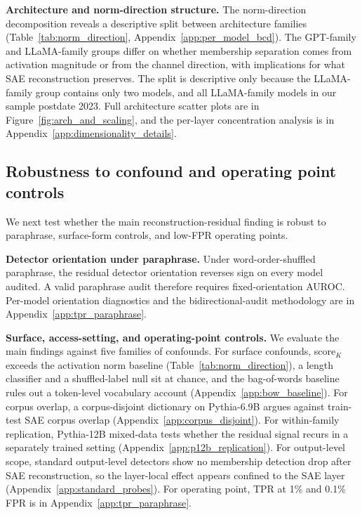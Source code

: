 \textbf{Architecture and norm-direction structure.}
The norm-direction decomposition reveals a descriptive split between architecture families (Table~\ref{tab:norm_direction}, Appendix~\ref{app:per_model_bcd}). The GPT-family and LLaMA-family groups differ on whether membership separation comes from activation magnitude or from the channel direction, with implications for what SAE reconstruction preserves. The split is descriptive only because the LLaMA-family group contains only two models, and all LLaMA-family models in our sample postdate 2023. Full architecture scatter plots are in Figure~\ref{fig:arch_and_scaling}, and the per-layer concentration analysis is in Appendix~\ref{app:dimensionality_details}.

\subsection{Robustness to confound and operating point controls}
\label{sec:results:robustness}

We next test whether the main reconstruction-residual finding is robust to paraphrase, surface-form controls, and low-FPR operating points.

\textbf{Detector orientation under paraphrase.}
Under word-order-shuffled paraphrase, the residual detector orientation reverses sign on every model audited. A valid paraphrase audit therefore requires fixed-orientation AUROC. Per-model orientation diagnostics and the bidirectional-audit methodology are in Appendix~\ref{app:tpr_paraphrase}.

\textbf{Surface, access-setting, and operating-point controls.}
We evaluate the main findings against five families of confounds. For surface confounds, score$_K$ exceeds the activation norm baseline (Table~\ref{tab:norm_direction}), a length classifier and a shuffled-label null sit at chance, and the bag-of-words baseline rules out a token-level vocabulary account (Appendix~\ref{app:bow_baseline}). For corpus overlap, a corpus-disjoint dictionary on Pythia-6.9B argues against train-test SAE corpus overlap (Appendix~\ref{app:corpus_disjoint}). For within-family replication, Pythia-12B mixed-data tests whether the residual signal recurs in a separately trained setting (Appendix~\ref{app:p12b_replication}). For output-level scope, standard output-level detectors show no membership detection drop after SAE reconstruction, so the layer-local effect appears confined to the SAE layer (Appendix~\ref{app:standard_probes}). For operating point, TPR at 1\% and 0.1\% FPR is in Appendix~\ref{app:tpr_paraphrase}.
